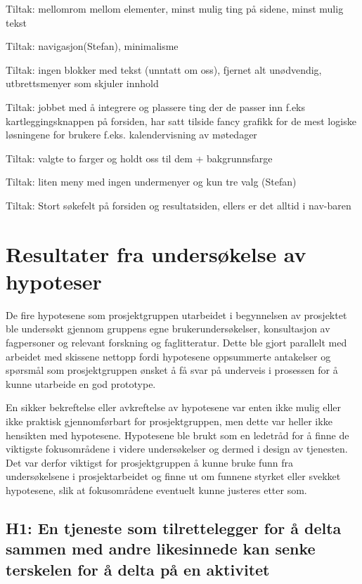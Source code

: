 Tiltak: mellomrom mellom elementer, minst mulig ting på sidene, minst mulig tekst

Tiltak: navigasjon(Stefan), minimalisme

Tiltak: ingen blokker med tekst (unntatt om oss), fjernet alt unødvendig, utbrettsmenyer som skjuler innhold

Tiltak: jobbet med å integrere og plassere ting der de passer inn f.eks kartleggingsknappen på forsiden, har satt tilside fancy grafikk for de mest logiske løsningene for brukere f.eks. kalendervisning av møtedager

Tiltak: valgte to farger og holdt oss til dem + bakgrunnsfarge

Tiltak: liten meny med ingen undermenyer og kun tre valg (Stefan)

Tiltak: Stort søkefelt på forsiden og resultatsiden, ellers er det alltid i nav-baren


\section{Resultater fra undersøkelse av hypoteser}
De fire hypotesene som prosjektgruppen utarbeidet i begynnelsen av prosjektet ble undersøkt gjennom gruppens egne brukerundersøkelser, konsultasjon av fagpersoner og relevant forskning og faglitteratur. Dette ble gjort parallelt med arbeidet med skissene nettopp fordi hypotesene oppsummerte antakelser og spørsmål som prosjektgruppen ønsket å få svar på underveis i prosessen for å kunne utarbeide en god prototype.

En sikker bekreftelse eller avkreftelse av hypotesene var enten ikke mulig eller ikke praktisk gjennomførbart for prosjektgruppen, men dette var heller ikke hensikten med hypotesene. Hypotesene ble brukt som en ledetråd for å finne de viktigste fokusområdene i videre undersøkelser og dermed i design av tjenesten. Det var derfor viktigst for prosjektgruppen å kunne bruke funn fra undersøkelsene i prosjektarbeidet og finne ut om funnene styrket eller svekket hypotesene, slik at fokusområdene eventuelt kunne justeres etter som.

\subsection{H1: En tjeneste som tilrettelegger for å delta sammen med andre likesinnede kan senke terskelen for å delta på en aktivitet}

